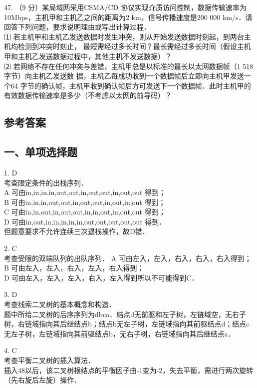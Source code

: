 47. （9 分）某局域网采用CSMA/CD 协议实现介质访问控制，数据传输速率为10Mbps，主机甲和主机乙之间的距离为2 km，信号传播速度是200 000 km/s．请回答下列问题，要求说明理由或写出计算过程． \\
⑴ 若主机甲和主机乙发送数据时发生冲突，则从开始发送数据时刻起，到两台主机均检测到冲突时刻止，
最短需经过多长时间？最长需经过多长时间（假设主机甲和主机乙发送数据过程中，其他主机不发送数据）？ \\
⑵ 若网络不存在任何冲突与差错，主机甲总是以标准的最长以太网数据帧（1 518字节）向主机乙发送数
据，主机乙每成功收到一个数据帧后立即向主机甲发送一个64 字节的确认帧，主机甲收到确认帧后方可发送下一个数据帧．此时主机甲的有效数据传输速率是多少（不考虑以太网的前导码）？

\subsection{参考答案}
\subsection{一、单项选择题}

1. D \\
考查限定条件的出栈序列． \\
A 可由in,in,in,in,out,out,in,out,out,in,out,out 得到； \\
B 可由in,in,in,out,out,in,out,out,in,out,in,out 得到； \\
C 可由in,in,out,in,out,out,in,in,out,in,out,out 得到； \\
D 可由in,out,in,in,in,in,in,out,out,out,out,out 得到． \\
但题意要求不允许连续三次退栈操作，故D错．

2. C \\
考查受限的双端队列的出队序列．
A 可由左入，左入，右入，右入，右入得到； \\
B 可由左入，左入，右入，左入，右入得到； \\
D 可由左入，左入，左入，右入，左入得到所以不可能得到C．

3. D \\
考查线索二叉树的基本概念和构造． \\
题中所给二叉树的后序序列为dbca．结点d无前驱和左子树，左链域空，无右子树，右链域指向其后继结点b；结点b无左子树，左链域指向其前驱结点d；结点c无左子树，左链域指向其前驱结点b，无右子树，右链域指向其后继结点a．

4. C \\
考查平衡二叉树的插入算法． \\
插入48以后，该二叉树根结点的平衡因子由-1变为-2，失去平衡，需进行两次旋转（先右旋后左旋）操作．

